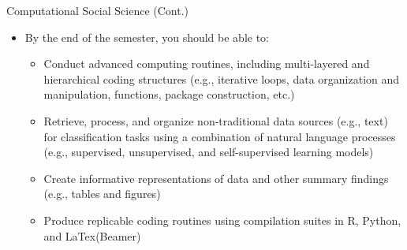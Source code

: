 \documentclass[
  ignorenonframetext,
]{beamer}
\providecommand{\tightlist}{%
  \setlength{\itemsep}{0pt}\setlength{\parskip}{0pt}}
\begin{document}
\begin{frame}{Computational Social Science (Cont.)}
\label{computational-social-science-cont.-1}
\begin{itemize}
\tightlist
\item
  By the end of the semester, you should be able to:

  \par \vspace{2.5mm}

  \begin{itemize}
  \tightlist
  \item
    Conduct advanced computing routines, including multi-layered and
    hierarchical coding structures \footnotesize (e.g., iterative loops,
    data organization and manipulation, functions, package construction,
    etc.)

    \par \vspace{1.5mm}
  \item
    Retrieve, process, and organize non-traditional data sources (e.g.,
    text) for classification tasks using a combination of natural
    language processes (e.g., supervised, unsupervised, and
    self-supervised learning models)

    \par \vspace{1.5mm}
  \item
    Create informative representations of data and other summary
    findings (e.g., tables and figures)

    \par \vspace{1.5mm}
  \item
    Produce replicable coding routines using compilation suites in R,
    Python, and LaTex(Beamer)

    \par \vspace{1.5mm}
  \end{itemize}
\end{itemize}
\end{frame}
\end{document}
